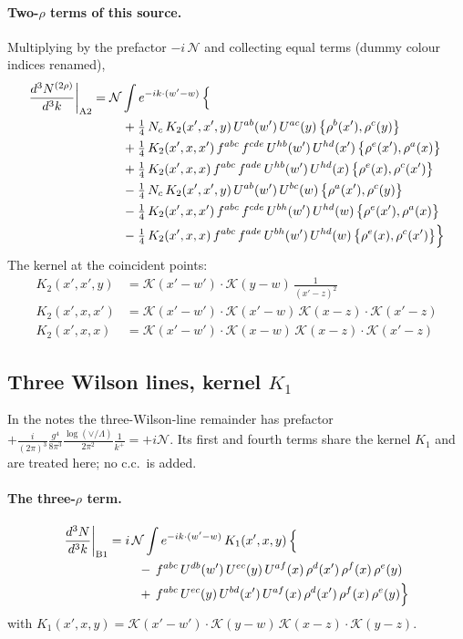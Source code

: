\documentclass[10pt]{article}
\numberwithin{equation}{section}
\newcommand{\KK}{\mathcal K}
\newcommand{\NN}{\mathcal N}
\begin{document}
\paragraph{Two-$\rho$ terms of this source.} Multiplying by the prefactor $-i\,\NN$ and collecting equal terms (dummy colour indices renamed),
\begin{align}
\frac{d^3N^{(2\rho)}}{d^3k}\bigg|_{\rm A2}={}&\NN\int e^{-ik\cdot(w'-w)}\,\Big\{\notag\\
&\quad +\tfrac14\,N_{c}\,K_2(x',x',y)\,U^{ab}(w')\,U^{ac}(y)\,\big\{\rho^{b}(x'),\rho^{c}(y)\big\}\notag\\
&\quad +\tfrac14\,K_2(x',x,x')\,f^{abc}\,f^{cde}\,U^{hb}(w')\,U^{hd}(x')\,\big\{\rho^{e}(x'),\rho^{a}(x)\big\}\notag\\
&\quad +\tfrac14\,K_2(x',x,x)\,f^{abc}\,f^{ade}\,U^{hb}(w')\,U^{hd}(x)\,\big\{\rho^{e}(x),\rho^{c}(x')\big\}\notag\\
&\quad -\tfrac14\,N_{c}\,K_2(x',x',y)\,U^{ab}(w')\,U^{bc}(w)\,\big\{\rho^{a}(x'),\rho^{c}(y)\big\}\notag\\
&\quad -\tfrac14\,K_2(x',x,x')\,f^{abc}\,f^{cde}\,U^{bh}(w')\,U^{hd}(w)\,\big\{\rho^{e}(x'),\rho^{a}(x)\big\}\notag\\
&\quad -\tfrac14\,K_2(x',x,x)\,f^{abc}\,f^{ade}\,U^{bh}(w')\,U^{hd}(w)\,\big\{\rho^{e}(x),\rho^{c}(x')\big\}\Big\}\label{eq:res-A2}
\end{align}
The kernel at the coincident points:
\begin{align*}
K_2(x',x',y)&=\KK(x'-w')\cdot\KK(y-w)\,\frac{1}{(x'-z)^2}\\K_2(x',x,x')&=\KK(x'-w')\cdot\KK(x'-w)\,\KK(x-z)\cdot\KK(x'-z)\\K_2(x',x,x)&=\KK(x'-w')\cdot\KK(x-w)\,\KK(x-z)\cdot\KK(x'-z)
\end{align*}
\subsection{Three Wilson lines, kernel $K_1$}\label{sec:B1}
In the notes the three-Wilson-line remainder has prefactor $+\frac{i}{(2\pi)^3}\frac{g^4}{8\pi^3}\frac{\log(\vee/\Lambda)}{2\pi^2}\frac1{k^+}=+i\NN$. Its first and fourth terms share the kernel $K_1$ and are treated here; no c.c.\ is added.
\paragraph{The three-$\rho$ term.}
\begin{align}
\frac{d^3N}{d^3k}\bigg|_{\rm B1}={}&i\,\NN\int e^{-ik\cdot(w'-w)}\,K_1(x',x,y)\,\Big\{\notag\\
&\quad -\,f^{abc}\,U^{db}(w')\,U^{ec}(y)\,U^{af}(x)\,\rho^{d}(x')\,\rho^{f}(x)\,\rho^{e}(y)\notag\\
&\quad +\,f^{abc}\,U^{ec}(y)\,U^{bd}(x')\,U^{af}(x)\,\rho^{d}(x')\,\rho^{f}(x)\,\rho^{e}(y)\Big\}\label{eq:in-B1}
\end{align}
with $K_1(x',x,y)=\KK(x'-w')\cdot\KK(y-w)\,\KK(x-z)\cdot\KK(y-z)$.
\end{document}
